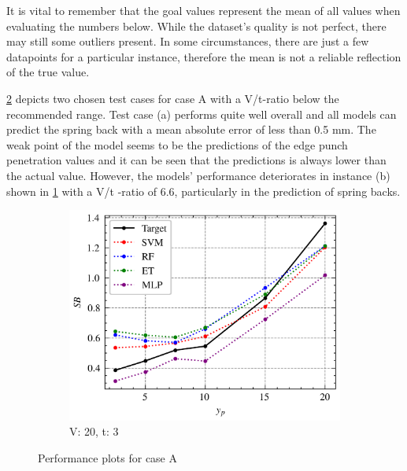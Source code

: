 It is vital to remember that the goal values represent the mean of all values when evaluating the numbers below.
While the dataset's quality is not perfect, there may still some outliers present.
In some circumstances, there are just a few datapoints for a particular instance, therefore the mean is not a reliable
reflection of the true value.

\cref{fig:performance-case-a} depicts two chosen test cases for case A with a V/t-ratio below the recommended
range.
Test case (a) performs quite well overall and all models can predict the spring back with a mean absolute error of
less than 0.5 mm.
The weak point of the model seems to be the predictions of the edge punch penetration values and it can be seen that
the predictions is always lower than the actual value.
However, the models' performance deteriorates in instance (b) shown in \cref{fig:performance-20-3.0} with a V/t
-ratio of 6.6, particularly in the prediction of spring backs.

\begin{figure}[h]
    \begin{tcolorbox}[arc=0pt,boxrule=0.5pt]
        \hfill
        \begin{subfigure}{0.5\textwidth}
            \includegraphics[width=\textwidth]{chap5/images/performance_20_3.0}
            \caption{V: 20, t: 3}
            \label{fig:performance-20-3.0}
        \end{subfigure}
    \end{tcolorbox}
    \caption{Performance plots for case A}
    \label{fig:performance-case-a}
\end{figure}

